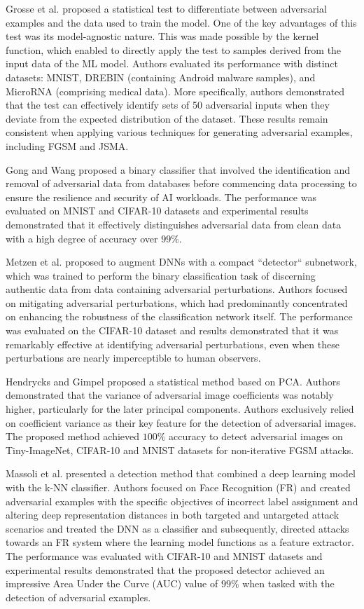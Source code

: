 \documentclass[sn-mathphys]{sn-jnl}%
\theoremstyle{thmstyleone}%
\theoremstyle{thmstyletwo}%
\theoremstyle{thmstylethree}%
\begin{document}
Grosse et al. \cite{grosse2017statistical} proposed a statistical test to differentiate between adversarial examples and the data used to train the model. One of the key advantages of this test was its model-agnostic nature. This was made possible by the kernel function, which enabled to directly apply the test to samples derived from the input data of the ML model. Authors evaluated its performance with distinct datasets: MNIST, DREBIN (containing Android malware samples), and MicroRNA (comprising medical data). More specifically, authors demonstrated that the test can effectively identify sets of 50 adversarial inputs when they deviate from the expected distribution of the dataset. These results remain consistent when applying various techniques for generating adversarial examples, including FGSM and JSMA. 

Gong and Wang \cite{gong2017adversarial} proposed a binary classifier that involved the identification and removal of adversarial data from databases before commencing data processing to ensure the resilience and security of AI workloads. The performance was evaluated on MNIST and CIFAR-10 datasets and experimental results demonstrated that it effectively distinguishes adversarial data from clean data with a high degree of accuracy over $99\%$. 

Metzen et al. \cite{metzen2017detecting} proposed to augment DNNs with a compact ``detector`` subnetwork, which was trained to perform the binary classification task of discerning authentic data from data containing adversarial perturbations. Authors focused on mitigating adversarial perturbations, which had predominantly concentrated on enhancing the robustness of the classification network itself. The performance was evaluated on the CIFAR-10 dataset and results demonstrated that it was remarkably effective at identifying adversarial perturbations, even when these perturbations are nearly imperceptible to human observers.

Hendrycks and Gimpel \cite{hendrycks2016early} proposed a statistical method based on PCA. Authors demonstrated that the variance of adversarial image coefficients was notably higher, particularly for the later principal components. Authors exclusively relied on coefficient variance as their key feature for the detection of adversarial images. The proposed method achieved $100\%$ accuracy to detect adversarial images on Tiny-ImageNet, CIFAR-10 and MNIST datasets for non-iterative FGSM attacks.

Massoli et al. \cite{massoli2021detection} presented a detection method that combined a deep learning model with the k-NN classifier. Authors focused on Face Recognition (FR) and created adversarial examples with the specific objectives of incorrect label assignment and altering deep representation distances in both targeted and untargeted attack scenarios and treated the DNN as a classifier and subsequently, directed attacks towards an FR system where the learning model functions as a feature extractor. The performance was evaluated with CIFAR-10 and MNIST datasets and experimental results demonstrated that the proposed detector achieved an impressive Area Under the Curve (AUC) value of $99\%$ when tasked with the detection of adversarial examples. 
\end{document}
